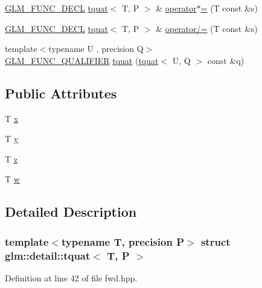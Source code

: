 \begin{DoxyCompactItemize}
\item 
\hyperlink{setup_8hpp_ab2d052de21a70539923e9bcbf6e83a51}{G\+L\+M\+\_\+\+F\+U\+N\+C\+\_\+\+D\+E\+CL} \hyperlink{structglm_1_1detail_1_1tquat}{tquat}$<$ T, P $>$ \& \hyperlink{structglm_1_1detail_1_1tquat_a65a23d874bc35ecade85c50bf5425a90}{operator$\ast$=} (T const \&s)
\item 
\hyperlink{setup_8hpp_ab2d052de21a70539923e9bcbf6e83a51}{G\+L\+M\+\_\+\+F\+U\+N\+C\+\_\+\+D\+E\+CL} \hyperlink{structglm_1_1detail_1_1tquat}{tquat}$<$ T, P $>$ \& \hyperlink{structglm_1_1detail_1_1tquat_a1a620ff3b4f138ad2f2fa34f36de1097}{operator/=} (T const \&s)
\item 
{\footnotesize template$<$typename U , precision Q$>$ }\\\hyperlink{setup_8hpp_a33fdea6f91c5f834105f7415e2a64407}{G\+L\+M\+\_\+\+F\+U\+N\+C\+\_\+\+Q\+U\+A\+L\+I\+F\+I\+ER} \hyperlink{structglm_1_1detail_1_1tquat_a5a904126767e3f0d447ea22e27447e7e}{tquat} (\hyperlink{structglm_1_1detail_1_1tquat}{tquat}$<$ U, Q $>$ const \&q)
\end{DoxyCompactItemize}
\subsection*{Public Attributes}
\begin{DoxyCompactItemize}
\item 
T \hyperlink{structglm_1_1detail_1_1tquat_ae4db777c41ba0c7329107a4c7aa1f956}{x}
\item 
T \hyperlink{structglm_1_1detail_1_1tquat_a50895e2da4e59255b25271a44ae3e43d}{y}
\item 
T \hyperlink{structglm_1_1detail_1_1tquat_a65c2b0af6a4b59327015b766f25416ef}{z}
\item 
T \hyperlink{structglm_1_1detail_1_1tquat_a83472ee38e4268c15ac92658e1ebfbb0}{w}
\end{DoxyCompactItemize}


\subsection{Detailed Description}
\subsubsection*{template$<$typename T, precision P$>$\newline
struct glm\+::detail\+::tquat$<$ T, P $>$}



Definition at line 42 of file fwd.\+hpp.



